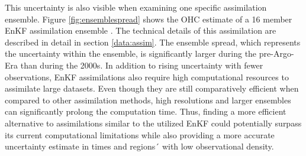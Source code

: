 \documentclass[Masterarbeit.tex]{subfile}
\begin{document}
	This uncertainty is also visible when examining one specific assimilation ensemble. Figure \ref{fig:ensemblespread} shows the OHC estimate of a 16 member EnKF assimilation ensemble \citep{brune_preserving_2020}. The technical details of this assimilation are described in detail in section \ref{data:assim}. The ensemble spread, which represents the uncertainty within the ensemble, is significantly larger during the pre-Argo-Era than during the 2000s. In addition to rising uncertainty with fewer observations, EnKF assimilations also require high computational resources to assimilate large datasets. Even though they are still comparatively efficient when compared to other assimilation methods, high resolutions and larger ensembles can significantly prolong the computation time. Thus, finding a more efficient alternative to assimilations similar to the utilized EnKF could potentially surpass its current computational limitations while also providing a more accurate uncertainty estimate in times and regions´ with low observational density.\\
	
\end{document}
